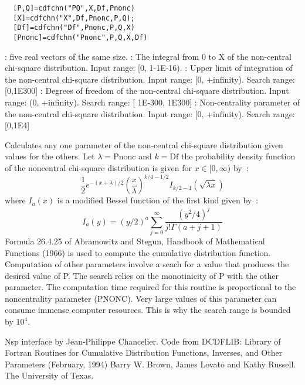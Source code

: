 \begin{mandesc}
\end{mandesc}
\label{cdfchn}
\begin{calling_sequence}
\begin{verbatim}
  [P,Q]=cdfchn("PQ",X,Df,Pnonc)  
  [X]=cdfchn("X",Df,Pnonc,P,Q);  
  [Df]=cdfchn("Df",Pnonc,P,Q,X)  
  [Pnonc]=cdfchn("Pnonc",P,Q,X,Df)  
\end{verbatim}
\end{calling_sequence}
\begin{parameters}
  \begin{varlist}
     : five real vectors of the same size.
     :  The integral from 0 to X of the non-central chi-square distribution. 
    Input range: [0, 1-1E-16).
       : Upper limit of integration of the non-central chi-square distribution. Input range: [0, +infinity). Search range: [0,1E300]
         : Degrees of freedom of the non-central chi-square distribution. Input range: (0, +infinity). Search range: [ 1E-300, 1E300]
         :  Non-centrality parameter of the non-central chi-square distribution. Input range: [0, +infinity). Search range: [0,1E4]
  \end{varlist}
\end{parameters}

\begin{mandescription}
  Calculates any one parameter of the non-central chi-square
  distribution given values for the others. Let $\lambda = \mbox{Pnonc}$ and 
  $k = \mbox{Df}$ the probability density function of the noncentral chi-square 
  distribution is given for $x\in [0,\infty)$  by~:
  \begin{equation} 
    \frac{1}{2}e^{-(x+\lambda)/2}\left (\frac{x}{\lambda} \right)^{k/4-1/2} I_{k/2-1}(\sqrt{\lambda x})
  \end{equation}
  where $I_a(x)$ is a modified Bessel function of the first kind given by~:
  \begin{equation} 
      I_a(y) = (y/2)^a \sum_{j=0}^\infty \frac{ (y^2/4)^j}{j! \Gamma(a+j+1)} 
  \end{equation}
  Formula  26.4.25 of Abramowitz and Stegun,
  Handbook  of Mathematical  Functions (1966) is used to compute the cumulative
  distribution function.
  Computation of other parameters involve a seach for a value that
  produces  the desired  value  of P.   The search relies  on  the
  monotinicity of P with the other parameter.
  The computation time  required for this  routine is proportional
  to the noncentrality  parameter  (PNONC).  Very large  values of
  this parameter can consume immense  computer resources.  This is
  why the search range is bounded by $10^4$.
\end{mandescription}

\begin{authors}
  Nsp interface by Jean-Philippe Chancelier. Code from DCDFLIB: 
  Library of Fortran Routines for Cumulative Distribution
  Functions, Inverses, and Other Parameters (February, 1994)
  Barry W. Brown, James Lovato and Kathy Russell. The University of Texas.
\end{authors}
